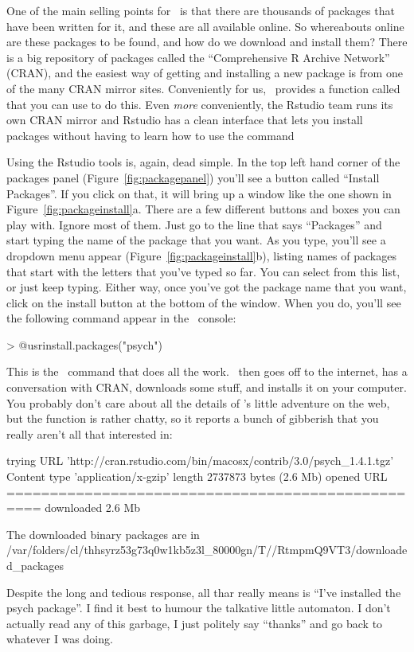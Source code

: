 
One of the main selling points for \R\ is that there are thousands of packages that have been written for it, and these are all available online. So whereabouts online are these packages to be found, and how do we download and install them?  There is a big repository of packages called the ``Comprehensive R Archive Network'' (CRAN), and the easiest way of getting and installing a new package is from one of the many CRAN mirror sites. Conveniently for us, \R\ provides a function called  that you can use to do this. Even {\it more} conveniently, the Rstudio team runs its own CRAN mirror and Rstudio has a clean interface that lets you install packages without having to learn how to use the  command

Using the Rstudio tools is, again, dead simple. In the top left hand corner of the packages panel (Figure~\ref{fig:packagepanel}) you'll see a button called ``Install Packages''. If you click on that, it will bring up a window like the one shown in Figure~\ref{fig:packageinstall}a. There are a few different buttons and boxes you can play with. Ignore most of them. Just go to the line that says ``Packages'' and start typing the name of the package that you want. As you type, you'll see a dropdown menu appear (Figure~\ref{fig:packageinstall}b), listing names of packages that start with the letters that you've typed so far. You can select from this list, or just keep typing. Either way, once you've got the package name that you want, click on the install button at the bottom of the window. When you do, you'll see the following command appear in the \R\ console:
\begin{rblock1}
> @usr{install.packages("psych")}
\end{rblock1}
This is the \R\ command that does all the work. \R\ then goes off to the internet, has a conversation with CRAN, downloads some stuff, and installs it on your computer. You probably don't care about all the details of \R's little adventure on the web, but the  function is rather chatty, so it reports a bunch of gibberish that you really aren't all that interested in:
\begin{rblock1}
trying URL 'http://cran.rstudio.com/bin/macosx/contrib/3.0/psych_1.4.1.tgz'
Content type 'application/x-gzip' length 2737873 bytes (2.6 Mb)
opened URL
==================================================
downloaded 2.6 Mb


The downloaded binary packages are in
	/var/folders/cl/thhsyrz53g73q0w1kb5z3l_80000gn/T//RtmpmQ9VT3/downloaded_packages
\end{rblock1}
Despite the long and tedious response, all thar really means is ``I've installed the psych package''. I find it best to humour the talkative little automaton. I don't actually read any of this garbage, I just politely say ``thanks'' and go back to whatever I was doing.  


